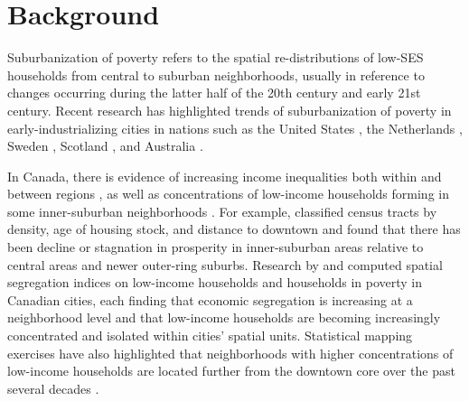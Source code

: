 \section{Background}


Suburbanization of poverty refers to the spatial re-distributions of low-SES households from central to suburban neighborhoods, usually in reference to changes occurring during the latter half of the 20th century and early 21st century. Recent research has highlighted trends of suburbanization of poverty in early-industrializing cities in nations such as the United States
\cite{kneebone_suburbanization_2010,howell_racial_2014,cooke_suburbanization_2015}, the Netherlands \cite{hochstenbach_gentrification_2018}, Sweden , Scotland \cite{kavanagh_is_2016}, and Australia \cite{randolph_suburbanizing_2014}.

In Canada, there is evidence of increasing income inequalities both within and between regions
\cite{walks_income_2013,bolton_growing_2012,breau_rising_2015,chen_why_2012}, 
as well as concentrations of low-income households forming in some inner-suburban neighborhoods
\cite{ades_are_2012,pavlic_declining_2014,ades_is_2016,breau_pulling_2018}.
For example,  classified census tracts by density, age of housing stock, and distance to downtown and found that there has been decline or stagnation in prosperity in inner-suburban areas relative to central areas and newer outer-ring suburbs. Research by  and  computed spatial segregation indices on low-income households and households in poverty in Canadian cities, each finding that economic segregation is increasing at a neighborhood level and that low-income households are becoming increasingly concentrated and isolated within cities' spatial units. Statistical mapping exercises have also highlighted that neighborhoods with higher concentrations of low-income households are located further from the downtown core over the past several decades \cite{ades_are_2012,breau_pulling_2018}.


